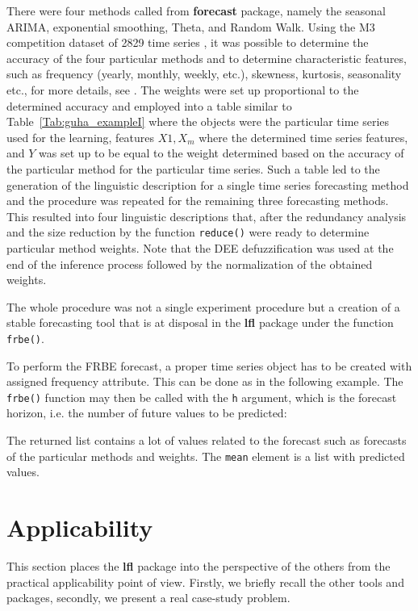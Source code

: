 \documentclass[review]{elsarticle}
\newcommand{\pkg}[1]{\textbf{#1}}
\newcommand{\code}[1]{\texttt{#1}}
\begin{document}
There were four methods called from \pkg{forecast} package, namely the seasonal ARIMA, exponential smoothing, Theta, and Random Walk. Using the M3 competition dataset of 2829 time series \citep{m3}, it was possible to determine the accuracy of the four particular methods and to determine characteristic features, such as frequency (yearly, monthly, weekly, etc.), skewness, kurtosis, seasonality etc., for more details, see \cite{frbe2014}. The weights were set up proportional to the determined accuracy and employed into a table similar to Table~\ref{Tab:guha_exampleI} where the objects were the particular time series used for the learning, features $X1, X_m$ where the determined time series features, and $Y$ was set up to be equal to the weight determined based on the accuracy of the particular method for the particular time series. Such a table led to the generation of the linguistic description for a single time series forecasting method and the procedure was repeated for the remaining three forecasting methods. This resulted into four linguistic descriptions that, after the redundancy analysis \citep{Dvorak_etal:RedundancyFSS} and the size reduction by the function \code{reduce()} were ready to determine particular method weights. Note that the DEE defuzzification was used at the end of the inference process followed by the normalization of the obtained weights. 

The whole procedure was not a single experiment procedure but a creation of a stable forecasting tool that is at disposal in the \pkg{lfl} package under the function \code{frbe()}.

To perform the FRBE forecast, a proper time series object has to be created with assigned frequency attribute. This can be done as in the following example. The \code{frbe()} function may then be called with the \code{h} argument, which is the forecast horizon, i.e. the number of future values to be predicted:
%

%
The returned list contains a lot of values related to the forecast such as forecasts of the particular methods and weights. The \code{mean} element is a list with predicted values.


\section{Applicability}
\label{sec:applicability}

This section places the \pkg{lfl} package into the perspective of the others from the practical applicability point of view. Firstly, we briefly recall the other tools and packages, secondly, we present a real case-study problem. 
\end{document}
